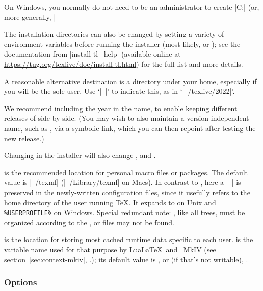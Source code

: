 \documentclass{article}
\begin{document}
On Windows, you normally do not need to be an administrator to
create |C:\texlive{}| (or, more generally,
|%

The installation directories can also be changed by setting a variety of
environment variables before running the installer (most likely,
 or
); see the documentation from
|install-tl --help| (available online at
\url{https://tug.org/texlive/doc/install-tl.html}) for the full list and
more details.

A reasonable alternative destination is a directory under your home,
especially if you will be the sole user. Use `|~|' to indicate this, as
in `|~/texlive/2022|'.

We recommend including the year in the name, to enable keeping different
releases of \TL{} side by side.  (You may wish to also maintain a
version-independent name, such as , via a
symbolic link, which you can then repoint after testing the new release.)

Changing  in the installer will also change
,  and
.

 is the recommended location for personal macro files
or packages.  The default value is |~/texmf| (|~/Library/texmf| on
Macs).  In contrast to , here a |~| is preserved in the
newly-written configuration files, since it usefully refers to the home
directory of the user running \TeX.  It expands to  on
Unix and \verb|%USERPROFILE%| on Windows.  Special redundant note:
, like all trees, must be organized according to the
\TDS, or files may not be found.

 is the location for storing most cached runtime data
specific to each user.   is the variable name used
for that purpose by Lua\LaTeX\ and \ConTeXt\ MkIV (see
section~\ref{sec:context-mkiv}, \p.\pageref{sec:context-mkiv}); its
default value is , or (if that's not writable),
.


\subsubsection{Options}
\label{sec:options}
\end{document}
